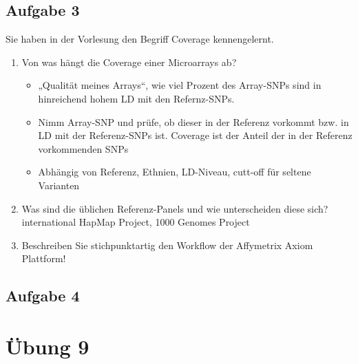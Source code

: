 \documentclass[13pt,a4paper]{article}
\begin{document}
\subsection{Aufgabe 3}
Sie haben in der Vorlesung den Begriff Coverage kennengelernt.\\
\begin{enumerate}
	\item Von was hängt die Coverage einer Microarrays ab?
	\begin{itemize}
		\item „Qualität meines Arrays“, wie viel Prozent des Array-SNPs sind in hinreichend hohem LD mit den Refernz-SNPs.
		\item Nimm Array-SNP und prüfe, ob dieser in der Referenz vorkommt bzw. in LD mit der Referenz-SNPs ist. Coverage ist der Anteil der in der Referenz vorkommenden SNPs
		\item Abhängig von Referenz, Ethnien, LD-Niveau, cutt-off für seltene Varianten
	\end{itemize}
	\item Was sind die üblichen Referenz-Panels und wie unterscheiden diese sich? 
international HapMap Project, 1000 Genomes Project
	\item Beschreiben Sie stichpunktartig den Workflow der Affymetrix Axiom Plattform!
\end{enumerate}

\subsection{Aufgabe 4}

\newpage
\section{Übung 9}
\end{document}
